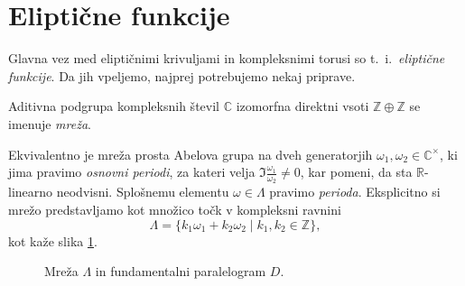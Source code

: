 \documentclass[mat1]{fmfdelo}
\newcommand{\R}{\mathbb R}
\newcommand{\Z}{\mathbb Z}
\newcommand{\C}{\mathbb C}
\newcommand{\CM}{\mathbb C ^\times}
\theoremstyle{definition}
\begin{document}
\section{Eliptične funkcije} \label{elipticne funkcije}

Glavna vez med eliptičnimi krivuljami in kompleksnimi torusi so t.~i.\ \emph{eliptične funkcije}. Da jih vpeljemo, najprej potrebujemo nekaj priprave.

\begin{definicija}
    Aditivna podgrupa kompleksnih števil $\C$ izomorfna direktni vsoti $\Z \oplus \Z$ se imenuje \emph{mreža}. 
\end{definicija}
    
Ekvivalentno je mreža prosta Abelova grupa na dveh generatorjih $\omega_1, \omega_2 \in \CM$, ki jima pravimo \emph{osnovni periodi}, za kateri velja $\Im \frac{\omega_1}{\omega_2} \neq 0$, kar pomeni, da sta $\R$-linearno neodvisni. Splošnemu elementu $\omega \in \Lambda$ pravimo \emph{perioda}. Eksplicitno si mrežo predstavljamo kot množico točk v kompleksni ravnini
\[
    \Lambda = \{k_1 \omega_1 + k_2 \omega_2 \mid k_1, k_2 \in \Z\},  
\]
kot kaže slika \ref{mreza}.
\\

\begin{figure}[H]
    \centering

    \caption{Mreža $\Lambda$ in fundamentalni paralelogram $D$.}
    \label{mreza}
\end{figure}
\end{document}
